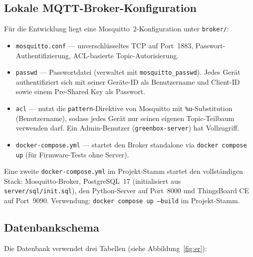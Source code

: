 \documentclass[a4paper,12pt]{article}
\begin{document}
\subsection{Lokale MQTT-Broker-Konfiguration}

Für die Entwicklung liegt eine Mosquitto~2-Konfiguration unter
\texttt{broker/}:

\begin{itemize}
  \item \texttt{mosquitto.conf} --- unverschlüsseltes TCP auf
        Port~1883, Passwort-Authentifizierung,
        ACL-basierte Topic-Autorisierung.
  \item \texttt{passwd} --- Passwortdatei (verwaltet mit
        \texttt{mosquitto\_passwd}). Jedes Gerät authentifiziert
        sich mit seiner Geräte-ID als Benutzername und Client-ID
        sowie einem Pre-Shared Key als Passwort.
  \item \texttt{acl} --- nutzt die \texttt{pattern}-Direktive von
        Mosquitto mit \texttt{\%u}-Substitution (Benutzername),
        sodass jedes Gerät nur seinen eigenen Topic-Teilbaum
        verwenden darf. Ein Admin-Benutzer
        (\texttt{greenbox-server}) hat Vollzugriff.
  \item \texttt{docker-compose.yml} --- startet den Broker
        standalone via \texttt{docker compose up} (für
        Firmware-Tests ohne Server).
\end{itemize}

\noindent Eine zweite \texttt{docker-compose.yml} im Projekt-Stamm
startet den vollständigen Stack: Mosquitto-Broker, PostgreSQL~17
(initialisiert aus \texttt{server/sql/init.sql}), den Python-Server
auf Port~8000 und ThingsBoard CE auf Port~9090. Verwendung:
\texttt{docker compose up --build} im Projekt-Stamm.

\subsection{Datenbankschema}

Die Datenbank verwendet drei Tabellen (siehe Abbildung~\ref{fig:er}):
\end{document}
